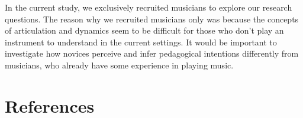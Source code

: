 \documentclass[
  man,floatsintext]{apa6}
\begin{document}
In the current study, we exclusively recruited musicians to explore our research questions. The reason why we recruited musicians only was because the concepts of articulation and dynamics seem to be difficult for those who don't play an instrument to understand in the current settings. It would be important to investigate how novices perceive and infer pedagogical intentions differently from musicians, who already have some experience in playing music.

\newpage

\hypertarget{references}{%
\section{References}\label{references}}

\begingroup
\setlength{\parindent}{-0in}
\setlength{\leftskip}{0in}
\end{document}

